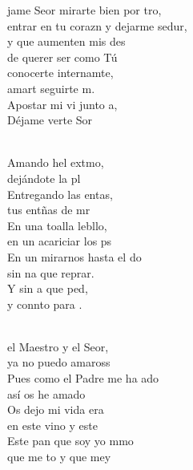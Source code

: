 \documentclass[12pt]{article}
\begin{document}
\begin{multicols*}{2}
\begin{cancion}%
	jame Seor mirarte bien por tro,\\
	entrar en tu corazn y dejarme sedur,\\
	y que aumenten mis des \\
	de querer ser como Tú\\
	conocerte internamte, \\
	amart seguirte m.\\
	Apostar mi vi junto a,\\
	Déjame verte Sor\\\jump\\
	\begin{chorus}%
	Amando hel extmo, \\
	dejándote la pl\\
	Entregando las entas,  \\
	tus entñas de mr\\
	En una toalla lebllo, \\
	en un acariciar los ps\\
	En un mirarnos hasta el do \\
	sin na que reprar.\\
	Y sin a que ped, \\
	y connto para .\\
	\end{chorus}%
	\jump\\
	 el Maestro y el Seor, \\
	ya no puedo amaross \\
	Pues como el Padre me ha ado \\
	así os he amado \\
	Os dejo mi vida era \\
	en este vino y este \\
	Este pan que soy yo mmo \\
	que me to y que mey\\

\end{cancion}
\end{multicols*}
\end{document}
